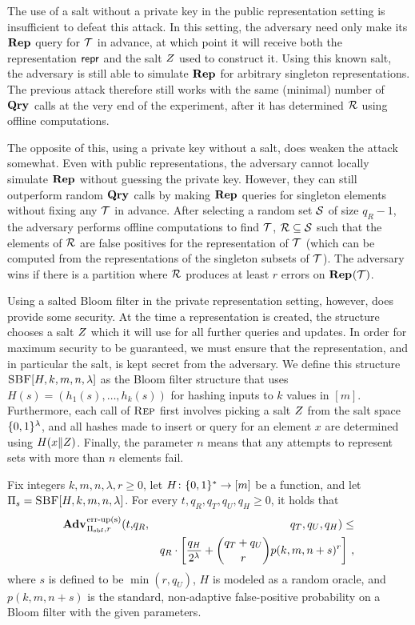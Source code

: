The use of a salt without a private key in the public representation setting is insufficient to defeat this attack. In this setting, the adversary need only make its $\mathbf{Rep}\hspace{0.5pt}$ query for $\mathcal{T}$ in advance, at which point it will receive both the representation $\mathsf{repr}$ and the salt $Z$ used to construct it. Using this known salt, the adversary is still able to simulate $\mathbf{Rep}\hspace{0.5pt}$ for arbitrary singleton representations. The previous attack therefore still works with the same (minimal) number of $\mathbf{Qry}\hspace{0.5pt}$ calls at the very end of the experiment, after it has determined $\mathcal{R}$ using offline computations.

The opposite of this, using a private key without a salt, does weaken the attack somewhat. Even with public representations, the adversary cannot locally simulate $\mathbf{Rep}\hspace{0.5pt}$ without guessing the private key. However, they can still outperform random $\mathbf{Qry}\hspace{0.5pt}$ calls by making $\mathbf{Rep}\hspace{0.5pt}$ queries for singleton elements without fixing any $\mathcal{T}$ in advance. After selecting a random set $\mathcal{S}$ of size $q_R-1$, the adversary performs offline computations to find $\mathcal{T}$, $\mathcal{R} \subseteq \mathcal{S}$ such that the elements of $\mathcal{R}$ are false positives for the representation of $\mathcal{T}$ (which can be computed from the representations of the singleton subsets of $\mathcal{T}$). The adversary wins if there is a partition where $\mathcal{R}$ produces at least $r$ errors on $\mathbf{Rep}\hspace{0.5pt}(\mathcal{T})$.


Using a salted Bloom filter in the private representation setting, however, does provide some security. At the time a representation is created, the structure chooses a salt $Z$ which it will use for all further queries and updates. In order for maximum security to be guaranteed, we must ensure that the representation, and in particular the salt, is kept secret from the adversary. We define this structure $\textsc{SBF}[H,k,m,n,\lambda]$ as the Bloom filter structure that uses $H(s) = (h_1(s),\ldots,h_k(s))$ for hashing inputs to $k$ values in $[m]$. Furthermore, each call of $\textsc{Rep}$ first involves picking a salt $Z$ from the salt space $\{0,1\}^\lambda$, and all hashes made to insert or query for an element $x$ are determined using $H(x \Vert Z)$. Finally, the parameter $n$ means that any attempts to represent sets with more than $n$ elements fail.

\begin{theorem}\label{thm:bf-priv-salt-bound}
Fix integers $k, m, n, \lambda, r\geq 0$, let $H \colon \{0,1\}^* \to [m]$ be a function, and let $\mathrm{\Pi}_s = \textsc{SBF}[H,k,m,n,\lambda]$.
  For every $t, q_R, q_T, q_U, q_H \geq 0$, it holds that
  \begin{eqnarray*}
    \Adv{\erreps}_{\struct_\saltybloom,r}(t,&q_R,& q_T, q_U, q_H) \leq \\ && q_R \cdot
     \left[
      \frac{q_H}{2^\lambda} +
      {\dbinom{q_T+q_U}{r}} p(k, m, n+s)^r
    \right] \,,
\end{eqnarray*}
where $s$ is defined to be $\min(r,q_U)$, $H$ is modeled as a random oracle, and $p(k, m, n+s)$ is the standard, non-adaptive false-positive probability on a Bloom filter with the given parameters.
\end{theorem}

